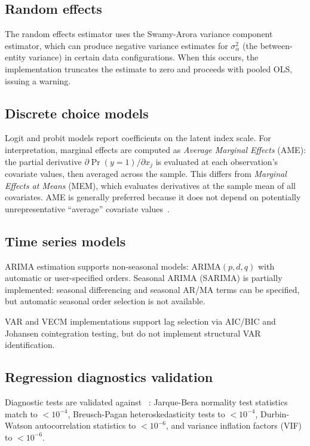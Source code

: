 \subsection{Random effects}

The random effects estimator uses the Swamy-Arora variance component estimator,
which can produce negative variance estimates for $\sigma^2_\alpha$ (the
between-entity variance) in certain data configurations. When this occurs,
the implementation truncates the estimate to zero and proceeds with pooled
OLS, issuing a warning.

\subsection{Discrete choice models}

Logit and probit models report coefficients on the latent index scale. For
interpretation, marginal effects are computed as \emph{Average Marginal Effects}
(AME): the partial derivative $\partial \Pr(y=1)/\partial x_j$ is evaluated
at each observation's covariate values, then averaged across the sample.
This differs from \emph{Marginal Effects at Means} (MEM), which evaluates
derivatives at the sample mean of all covariates. AME is generally preferred
because it does not depend on potentially unrepresentative ``average''
covariate values~\citep{Cameron+Trivedi:2005}.

\subsection{Time series models}

ARIMA estimation supports non-seasonal models: ARIMA$(p,d,q)$ with automatic
or user-specified orders. Seasonal ARIMA (SARIMA) is partially implemented:
seasonal differencing and seasonal AR/MA terms can be specified, but automatic
seasonal order selection is not available.

VAR and VECM implementations support lag selection via AIC/BIC and Johansen
cointegration testing, but do not implement structural VAR identification.

\subsection{Regression diagnostics validation}

Diagnostic tests are validated against ~\citep{lmtest}:
Jarque-Bera normality test statistics match to $< 10^{-4}$,
Breusch-Pagan heteroskedasticity tests to $< 10^{-4}$,
Durbin-Watson autocorrelation statistics to $< 10^{-6}$, and
variance inflation factors (VIF) to $< 10^{-6}$.

